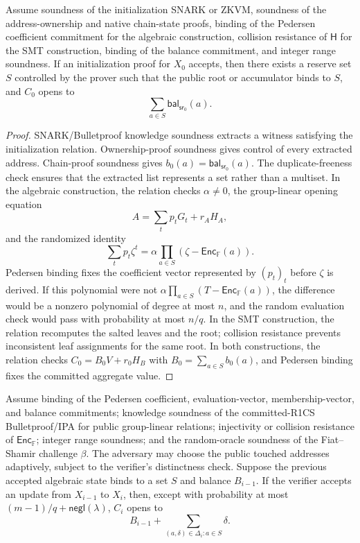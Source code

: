 \documentclass[runningheads]{llncs}
\newcommand{\F}{\mathbb{F}}
\newcommand{\Enc}{\mathsf{Enc}}
\newcommand{\CRH}{\mathsf{H}}
\newcommand{\bal}{\mathsf{bal}}
\newcommand{\sr}{\mathsf{sr}}
\newcommand{\negl}{\mathsf{negl}}
\newcommand{\dlist}{\Delta}
\begin{document}
\begin{theorem}
Assume soundness of the initialization SNARK or ZKVM, soundness of the address-ownership and native chain-state proofs, binding of the Pedersen coefficient commitment for the algebraic construction, collision resistance of \(\CRH\) for the SMT construction, binding of the balance commitment, and integer range soundness.  If an initialization proof for \(X_0\) accepts, then there exists a reserve set \(S\) controlled by the prover such that the public root or accumulator binds to \(S\), and \(C_0\) opens to
\[
        \sum_{a\in S}\bal_{\sr_0}(a).
\]
\end{theorem}

\begin{proof}
SNARK/Bulletproof knowledge soundness extracts a witness satisfying the initialization relation.  Ownership-proof soundness gives control of every extracted address.  Chain-proof soundness gives \(b_0(a)=\bal_{\sr_0}(a)\).  The duplicate-freeness check ensures that the extracted list represents a set rather than a multiset.  In the algebraic construction, the relation checks \(\alpha\ne0\), the group-linear opening equation
\[
        A=\sum_t p_tG_t+r_AH_A,
\]
and the randomized identity
\[
        \sum_t p_t\zeta^t=\alpha\prod_{a\in S}(\zeta-\Enc_\F(a)).
\]
Pedersen binding fixes the coefficient vector represented by \((p_t)_t\) before \(\zeta\) is derived.  If this polynomial were not \(\alpha\prod_{a\in S}(T-\Enc_\F(a))\), the difference would be a nonzero polynomial of degree at most \(n\), and the random evaluation check would pass with probability at most \(n/q\).  In the SMT construction, the relation recomputes the salted leaves and the root; collision resistance prevents inconsistent leaf assignments for the same root.  In both constructions, the relation checks \(C_0=B_0V+r_0H_B\) with \(B_0=\sum_{a\in S}b_0(a)\), and Pedersen binding fixes the committed aggregate value.
\end{proof}

\begin{theorem}\label{thm:alg-update-sound}
Assume binding of the Pedersen coefficient, evaluation-vector, membership-vector, and balance commitments; knowledge soundness of the committed-R1CS Bulletproof/IPA for public group-linear relations; injectivity or collision resistance of \(\Enc_\F\); integer range soundness; and the random-oracle soundness of the Fiat--Shamir challenge \(\beta\).  The adversary may choose the public touched addresses adaptively, subject to the verifier's distinctness check.  Suppose the previous accepted algebraic state binds to a set \(S\) and balance \(B_{i-1}\).  If the verifier accepts an update from \(X_{i-1}\) to \(X_i\), then, except with probability at most \((m-1)/q+\negl(\lambda)\), \(C_i\) opens to
\[
        B_{i-1}+\sum_{(a,\delta)\in\dlist_i:a\in S}\delta .
\]
\end{theorem}
\end{document}
